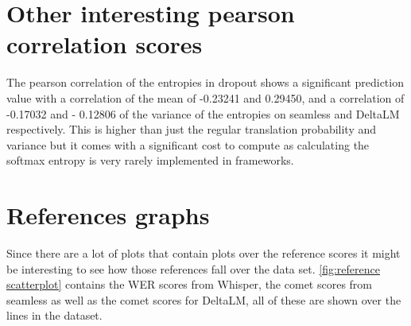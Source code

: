 \section{Other interesting pearson correlation scores}\label{dropout softmax entropy}

The pearson correlation of the entropies in dropout shows a significant prediction value with a correlation of the mean of -0.23241 and 0.29450, and a correlation of -0.17032 and - 0.12806 of the variance of the entropies on seamless and DeltaLM respectively. This is higher than just the regular translation probability and variance but it comes with a significant cost to compute as calculating the softmax entropy is very rarely implemented in frameworks.




\section{References graphs}
\label{sec:appendix:FirstSection}
Since there are a lot of plots that contain plots over the reference scores it might be interesting to see how those references fall over the data set. 
\autoref{fig:reference scatterplot} contains the WER scores from Whisper, the comet scores from seamless as well as the comet scores for DeltaLM, all of these are shown over the lines in the dataset.

\setcounter{figure}{0}

